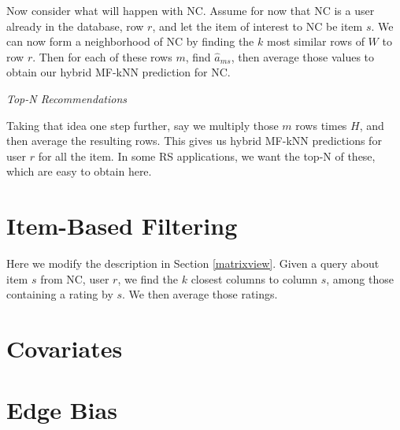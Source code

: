 Now consider what will happen with NC.  Assume for now that NC is a user
already in the database, row $r$,  and let the item of interest to NC be
item $s$.  We can now form a neighborhood of NC by finding the $k$ most
similar rows of $W$ to row $r$.  Then for each of these rows $m$, find
$\widehat{a}_{ms}$, then average those values to obtain our hybrid
MF-kNN prediction for NC. 

\textit{Top-N Recommendations}

Taking that idea one step further, say we multiply those $m$ rows times
$H$, and then average the resulting rows.  This gives us hybrid MF-kNN
predictions for user $r$ for all the item.  In some RS applications, we
want the top-N of these, which are easy to obtain here.

\section{Item-Based Filtering}

Here we modify the description in Section \ref{matrixview}.  Given a
query about item $s$ from NC, user $r$, we find the $k$ closest columns
to column $s$, among those containing a rating by $s$.  We then average
those ratings.

\section{Covariates}

\section{Edge Bias}


\iffalse

idxs <- sample(1:nrow(ml),1000)
ml <- ml[,1:3]
mltrn <- ml[-idxs,]
mltst <- ml[idxs,]
library(rectools)
ud <- formUserData(mltrn)

k <- 5
z <- apply(mltst[,-3],1,pn); mean(abs(z-mltst[,3]),na.rm=T)

predname <- function(userData,oneInputRow,k)
{
   usr <- oneInputRow[1]
   itm <- oneInputRow[2]
   udElement <- userData[[as.character(usr)]]
   predict(userData,udElement,itm,k)
}

pn <- function(oneInputRow) predname(ud,oneInputRow,k)


\fi

